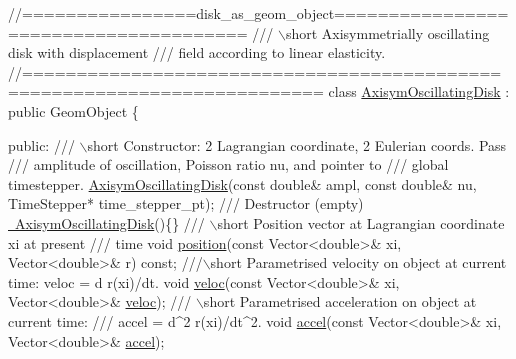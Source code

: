  
\begin{DoxyCodeInclude}
\textcolor{comment}{//================disk\_as\_geom\_object======================================}
\textcolor{comment}{/// \(\backslash\)short Axisymmetrially oscillating disk with displacement}
\textcolor{comment}{}\textcolor{comment}{/// field according to linear elasticity.}
\textcolor{comment}{}\textcolor{comment}{//=========================================================================}
\textcolor{keyword}{class }\hyperlink{classAxisymOscillatingDisk}{AxisymOscillatingDisk} : \textcolor{keyword}{public} GeomObject
\{

\textcolor{keyword}{public}:
\textcolor{comment}{}
\textcolor{comment}{ /// \(\backslash\)short Constructor: 2 Lagrangian coordinate, 2 Eulerian coords. Pass }
\textcolor{comment}{ /// amplitude of oscillation, Poisson ratio nu, and pointer to }
\textcolor{comment}{ /// global timestepper.}
\textcolor{comment}{} \hyperlink{classAxisymOscillatingDisk_a7671a9c1b8d4d854752ea14aa4f5865d}{AxisymOscillatingDisk}(\textcolor{keyword}{const} \textcolor{keywordtype}{double}& ampl, \textcolor{keyword}{const} \textcolor{keywordtype}{double}& nu, 
                       TimeStepper* time\_stepper\_pt);
\textcolor{comment}{}
\textcolor{comment}{ /// Destructor (empty)}
\textcolor{comment}{} \hyperlink{classAxisymOscillatingDisk_ab79de13fa0dcfac5d04d6ff371241c5d}{~AxisymOscillatingDisk}()\{\}
\textcolor{comment}{}
\textcolor{comment}{ /// \(\backslash\)short Position vector at Lagrangian coordinate xi at present}
\textcolor{comment}{ /// time}
\textcolor{comment}{} \textcolor{keywordtype}{void} \hyperlink{classAxisymOscillatingDisk_ab63d762c8fecce8de5a2b7dc4b3b677a}{position}(\textcolor{keyword}{const} Vector<double>& xi, Vector<double>& r) \textcolor{keyword}{const};
\textcolor{comment}{}
\textcolor{comment}{ ///\(\backslash\)short Parametrised velocity on object at current time: veloc = d r(xi)/dt.}
\textcolor{comment}{} \textcolor{keywordtype}{void} \hyperlink{classAxisymOscillatingDisk_a7b39985cb0658924472700f4383b53aa}{veloc}(\textcolor{keyword}{const} Vector<double>& xi, Vector<double>& \hyperlink{classAxisymOscillatingDisk_a7b39985cb0658924472700f4383b53aa}{veloc});
\textcolor{comment}{}
\textcolor{comment}{ /// \(\backslash\)short Parametrised acceleration on object at current time: }
\textcolor{comment}{ /// accel = d^2 r(xi)/dt^2.}
\textcolor{comment}{} \textcolor{keywordtype}{void} \hyperlink{classAxisymOscillatingDisk_a92993399b50f818c9045fe7cecf47fcb}{accel}(\textcolor{keyword}{const} Vector<double>& xi, Vector<double>& \hyperlink{classAxisymOscillatingDisk_a92993399b50f818c9045fe7cecf47fcb}{accel});

\end{DoxyCodeInclude}


